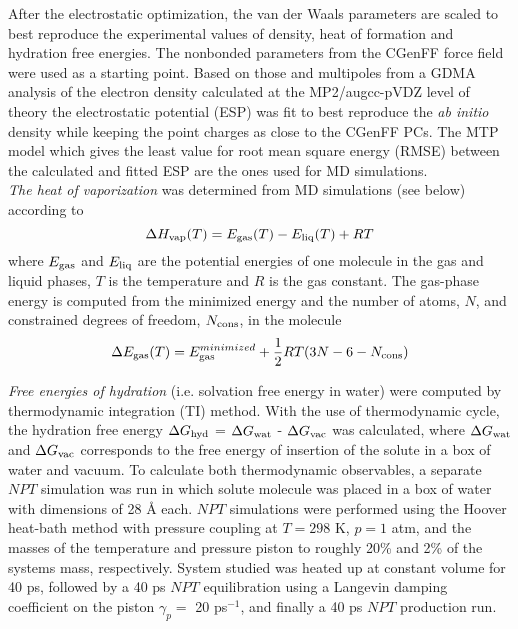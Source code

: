 \documentclass[journal=jacsat,manuscript=article]{achemso}
\begin{document}
\noindent
After the electrostatic optimization, the van der Waals parameters are
scaled to best reproduce the experimental values of density, heat of
formation and hydration free energies. The nonbonded parameters from
the CGenFF\cite{cgenff2012} force field were used as a starting
point. Based on those and multipoles from a GDMA
analysis\cite{Stone05p1128} of the electron density calculated at the
MP2\cite{gordon88mp2}/augcc-pVDZ\cite{dunning89BtoNe,dunning93AltoAr}
level of theory the electrostatic potential (ESP) was fit to best
reproduce the {\it ab initio} density while keeping the point charges
as close to the CGenFF PCs. The MTP model which gives the least value
for root mean square energy (RMSE) between the calculated and fitted
ESP are the ones used for MD simulations.  \\

\noindent
{\it The heat of vaporization} was determined from MD simulations (see
below) according to\cite{junmei2011}
   \begin{equation} 
   \label{heat_eqn}
   \Delta H_{\rm vap}(T) = E_{\rm gas}(T) -  E_{\rm liq}(T) + RT
   \end{equation}
where $E_{\rm gas}$ and $E_{\rm liq}$ are the potential energies of
one molecule in the gas and liquid phases, $T$ is the temperature and
$R$ is the gas constant.  The gas-phase energy is computed from the
minimized energy and the number of atoms, $N$, and constrained degrees
of freedom, $N_{\rm cons}$, in the molecule
   \begin{equation} 
   \label{heat_eqn2}
   \Delta E_{\rm gas}(T) = E_{\rm gas}^{minimized} +
   \frac{1}{2}RT(3N-6-N_{\rm cons})
   \end{equation}

{\it Free energies of hydration} (i.e. solvation free energy in water)
were computed by thermodynamic integration (TI) method. With the use
of thermodynamic cycle, the hydration free energy $\Delta G_{\rm hyd}$
= $\Delta G_{\rm wat}$ - $\Delta G_{\rm vac}$ was calculated, where
$\Delta G_{\rm wat}$ and $\Delta G_{\rm vac}$ corresponds to the free
energy of insertion of the solute in a box of water and vacuum. To
calculate both thermodynamic observables, a separate $NPT$ simulation
was run in which solute molecule was placed in a box of water with
dimensions of 28 \AA\/ each.  $NPT$ simulations were performed using
the Hoover heat-bath method with pressure coupling\cite{feller1995} at
$T = 298$ K, $p = 1$ atm, and the masses of the temperature and
pressure piston to roughly 20\% and 2\% of the systems mass,
respectively. System studied was heated up at constant volume for 40
ps, followed by a 40 ps $NPT$ equilibration using a Langevin damping
coefficient on the piston $\gamma_p=$ 20 ps$^{-1}$, and finally a 40
ps $NPT$ production run.\\
\end{document}
